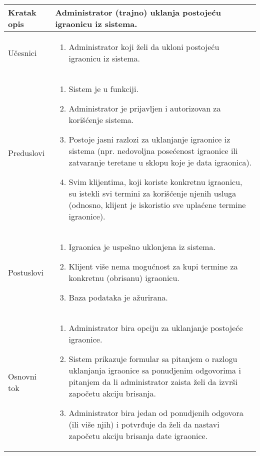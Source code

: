 \documentclass[../main.tex]{subfiles}
\begin{document}
\begin{longtable}{| p{} | p{} |} 

\hline
    Kratak opis &  Administrator (trajno) uklanja postojeću igraonicu iz sistema. \\ 
\hline    
    Učesnici & 
    	\begin{enumerate}
        \item Administrator koji želi da ukloni postojeću igraonicu iz sistema.
     \end{enumerate}\\
\hline
   Preduslovi & \begin{enumerate}
       \item Sistem je u funkciji.
       \item Administrator je prijavljen i autorizovan za korišćenje sistema.
       \item Postoje jasni razlozi za uklanjanje igraonice iz sistema (npr. nedovoljna posećenost igraonice ili zatvaranje teretane u sklopu koje je data igraonica).
       \item Svim klijentima, koji koriste konkretnu igraonicu, su istekli svi termini za korišćenje njenih usluga (odnosno, klijent je iskoristio sve uplaćene termine igraonice).
   \end{enumerate}\\
\hline  
    Postuslovi & \begin{enumerate}
        \item Igraonica je uspešno uklonjena iz sistema.
        \item Klijent više nema mogućnost za kupi termine za konkretnu (obrisanu) igraonicu.
        \item Baza podataka je ažurirana.
    \end{enumerate}\\
\hline
    Osnovni tok & \begin{enumerate}
        \item Administrator bira opciju za uklanjanje postojeće igraonice.
        \item Sistem prikazuje formular sa pitanjem o razlogu uklanjanja igraonice sa ponudjenim odgovorima i pitanjem da li administrator zaista želi da izvrši započetu akciju brisanja.
        \item Administrator bira jedan od ponudjenih odgovora (ili više njih) i potvrđuje da želi da nastavi započetu akciju brisanja date igraonice. 

\end{enumerate}
\end{longtable}
\end{document}
